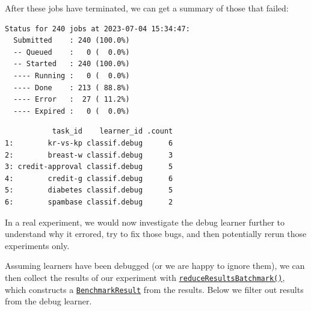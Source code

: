 After these jobs have terminated, we can get a summary of those that
failed:

\begin{Shaded}
\begin{Highlighting}[]
\NormalTok{(}
\end{Highlighting}
\end{Shaded}

\begin{verbatim}
Status for 240 jobs at 2023-07-04 15:34:47:
  Submitted    : 240 (100.0%)
  -- Queued    :   0 (  0.0%)
  -- Started   : 240 (100.0%)
  ---- Running :   0 (  0.0%)
  ---- Done    : 213 ( 88.8%)
  ---- Error   :  27 ( 11.2%)
  ---- Expired :   0 (  0.0%)
\end{verbatim}

\begin{Shaded}
\begin{Highlighting}[]
\OtherTok{=} \NormalTok{(}
 \NormalTok{(}\NormalTok{, }\NormalTok{),}
\end{Highlighting}
\end{Shaded}

\begin{verbatim}
           task_id    learner_id .count
1:        kr-vs-kp classif.debug      6
2:        breast-w classif.debug      3
3: credit-approval classif.debug      5
4:        credit-g classif.debug      6
5:        diabetes classif.debug      5
6:        spambase classif.debug      2
\end{verbatim}

In a real experiment, we would now investigate the debug learner further
to understand why it errored, try to fix those bugs, and then
potentially rerun those experiments only.

Assuming learners have been debugged (or we are happy to ignore them),
we can then collect the results of our experiment with
\href{https://mlr3batchmark.mlr-org.com/reference/reduceResultsBatchmark.html}{\texttt{reduceResultsBatchmark()}},
which constructs a
\href{https://mlr3.mlr-org.com/reference/BenchmarkResult.html}{\texttt{BenchmarkResult}}
from the results. Below we filter out results from the debug learner.

\begin{Shaded}
\begin{Highlighting}[]
\OtherTok{=} \NormalTok{(}\SpecialCharTok{!=} \NormalTok{,}
\OtherTok{=} 
\SpecialCharTok{$}\NormalTok{()[}\SpecialCharTok{:}\NormalTok{]}
\end{Highlighting}
\end{Shaded}


